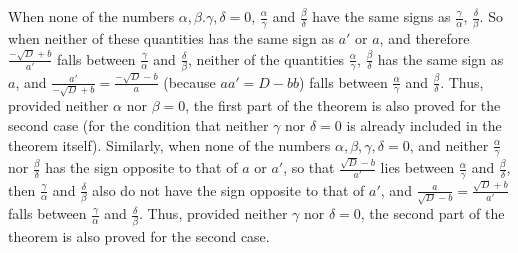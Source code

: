 When none of the numbers $\alpha,\beta.\gamma,\delta=0$, $\frac{\alpha}{\gamma}$ and $\frac{\beta}{\delta}$ have the same signs as $\frac{\gamma}{\alpha}$, $\frac{\delta}{\beta}$. So when neither of these quantities has the same sign as $a'$ or $a$, and therefore $\frac{-\surd D+b}{a'}$ falls between $\frac{\gamma}{\alpha}$ and $\frac{\delta}{\beta}$, neither of the quantities $\frac{\alpha}{\gamma}$, $\frac{\beta}{\delta}$ has the same sign as $a$, and $\frac{a'}{-\surd D+b}=\frac{-\surd D-b}{a}$ (because $aa'=D-bb$) falls between $\frac{\alpha}{\gamma}$ and $\frac{\beta}{\delta}$. Thus, provided neither $\alpha$ nor $\beta=0$, the first part of the theorem is also proved for the second case (for the condition that neither $\gamma$ nor $\delta=0$ is already included in the theorem itself). Similarly, when none of the numbers $\alpha,\beta,\gamma,\delta=0$,
and neither $\frac{\alpha}{\gamma}$ nor $\frac{\beta}{\delta}$ has the sign opposite to that of $a$ or $a'$, so that ${\frac{\surd D-b}{a'}}$ lies between $\frac{\alpha}{\gamma}$ and $\frac{\beta}{\delta}$, then $\frac{\gamma}{\alpha}$ and $\frac{\delta}{\beta}$ also do not have the sign opposite to that of $a'$, and $\frac{a}{\surd D-b}=\frac{\surd D+b}{a'}$ falls between $\frac{\gamma}{\alpha}$ and $\frac{\delta}{\beta}$. Thus, provided neither $\gamma$ nor $\delta=0$, the second part of the theorem is also proved for the second case.

